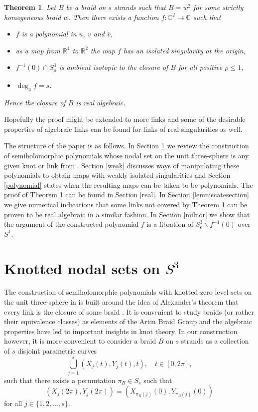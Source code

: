 \documentclass[notitlepage,12pt]{revtex4-1}
\newtheorem{theorem}{\bf Theorem}[section]
\begin{document}
\begin{theorem}
\label{even}
Let $B$ be a braid on $s$ strands such that $B=w^2$ for some strictly homogeneous braid $w$. Then there exists a function $f:\mathbb{C}^{2}\to\mathbb{C}$ such that
\begin{itemize}
\item $f$ is a polynomial in $u$, $v$ and $\overline{v}$,
\item as a map from $\mathbb{R}^{4}$ to $\mathbb{R}^{2}$ the map $f$ has an isolated singularity at the origin,
\item $f^{-1}(0)\cap S^{3}_{\rho}$ is ambient isotopic to the closure of $B$ for all positive $\rho\leq1$,
\item $\deg_{u} f=s$. 
\end{itemize}
Hence the closure of $B$ is real algebraic. 
\end{theorem}

Hopefully the proof might be extended to more links and some of the desirable properties of algebraic links can be found for links of real singularities as well.

The structure of the paper is as follows. In Section \ref{review} we review the construction of semiholomorphic polynomials whose nodal set on the unit three-sphere is any given knot or link from \cite{bode:2016polynomial}. Section \ref{weak} discusses ways of manipulating these polynomials to obtain maps with weakly isolated singularities and Section \ref{polynomial} states when the resulting maps can be taken to be polynomials. The proof of Theorem \ref{even} can be found in Section \ref{real}. In Section \ref{lemniscatesection} we give numerical indications that some links not covered by Theorem \ref{even} can be proven to be real algebraic in a similar fashion. In Section \ref{milnor} we show that the argument of the constructed polynomial $f$ is a fibration of $S^3_{\epsilon}\backslash f^{-1}(0)$ over $S^1$.

\section{Knotted nodal sets on $S^{3}$}
\label{review}

The construction of semiholomorphic polynomials with knotted zero level sets on the unit three-sphere in \cite{bode:2016polynomial} is built around the idea of Alexander's theorem that every link is the closure of some braid \cite{alexander:1923lemma}. It is convenient to study braids (or rather their equivalence classes) as elements of the Artin Braid Group and the algebraic properties have led to important insights in knot theory. In our construction however, it is more convenient to consider a braid $B$ on $s$ strands as a collection of $s$ disjoint parametric curves
\begin{equation}
\label{eq:para}
\bigcup_{j=1}^{s}\left(X_{j}(t),Y_{j}(t),t\right),\quad t\in[0,2\pi],
\end{equation} 
such that there exists a permutation $\pi_{B}\in S_{s}$ such that 
\begin{equation}(X_{j}(2\pi),Y_{j}(2\pi))=(X_{\pi_{B}(j)}(0),Y_{\pi_{B}(j)}(0)) 
\end{equation}
for all $j\in\{1,2,\ldots,s\}$.
\end{document}
